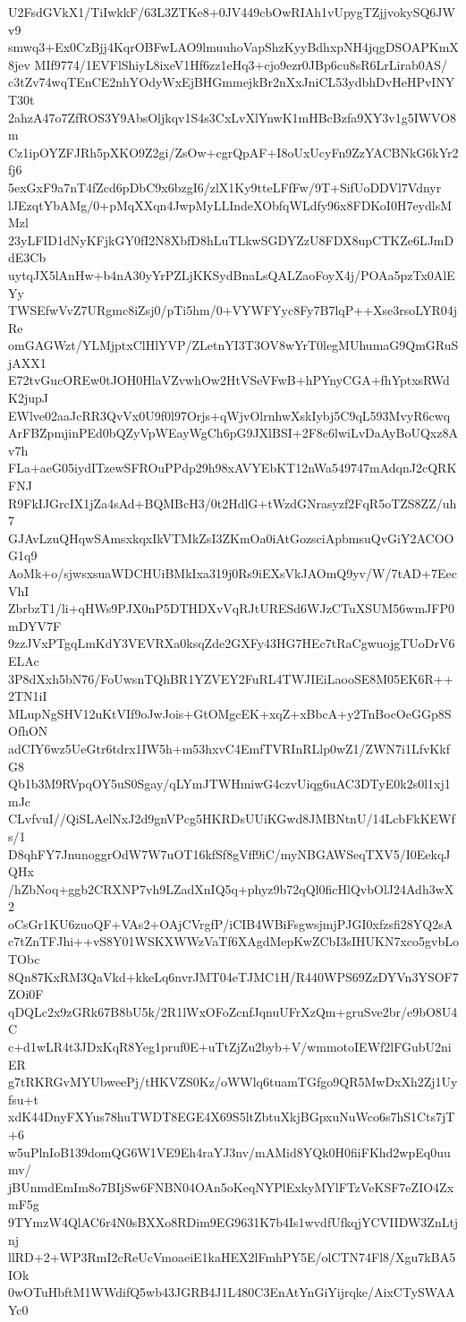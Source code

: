 U2FsdGVkX1/TiIwkkF/63L3ZTKe8+0JV449cbOwRIAh1vUpygTZjjvokySQ6JWv9
smwq3+Ex0CzBjj4KqrOBFwLAO9lmuuhoVapShzKyyBdhxpNH4jqgDSOAPKmX8jev
MIf9774/1EVFlShiyL8ixeV1Hf6zz1eHq3+cjo9ezr0JBp6cu8sR6LrLirab0AS/
c3tZv74wqTEnCE2nhYOdyWxEjBHGmmejkBr2nXxJniCL53ydbhDvHeHPvINYT30t
2ahzA47o7ZfROS3Y9AbsOljkqv1S4s3CxLvXlYnwK1mHBcBzfa9XY3v1g5IWVO8m
Cz1ipOYZFJRh5pXKO9Z2gi/ZsOw+cgrQpAF+I8oUxUcyFn9ZzYACBNkG6kYr2fj6
5exGxF9a7nT4fZcd6pDbC9x6bzgI6/zlX1Ky9tteLFfFw/9T+SifUoDDVl7Vdnyr
lJEzqtYbAMg/0+pMqXXqn4JwpMyLLIndeXObfqWLdfy96x8FDKoI0H7eydlsMMzl
23yLFID1dNyKFjkGY0fI2N8XbfD8hLuTLkwSGDYZzU8FDX8upCTKZe6LJmDdE3Cb
uytqJX5lAnHw+b4nA30yYrPZLjKKSydBnaLsQALZaoFoyX4j/POAa5pzTx0AlEYy
TWSEfwVvZ7URgmc8iZsj0/pTi5hm/0+VYWFYyc8Fy7B7lqP++Xse3rsoLYR04jRe
omGAGWzt/YLMjptxClHlYVP/ZLetnYI3T3OV8wYrT0legMUhumaG9QmGRuSjAXX1
E72tvGucOREw0tJOH0HlaVZvwhOw2HtVSeVFwB+hPYnyCGA+fhYptxsRWdK2jupJ
EWlve02aaJcRR3QvVx0U9f0l97Orjs+qWjvOlrnhwXskIybj5C9qL593MvyR6cwq
ArFBZpmjinPEd0bQZyVpWEayWgCh6pG9JXlBSI+2F8c6lwiLvDaAyBoUQxz8Av7h
FLa+aeG05iydITzewSFROuPPdp29h98xAVYEbKT12nWa549747mAdqnJ2cQRKFNJ
R9FkIJGrcIX1jZa4sAd+BQMBcH3/0t2HdlG+tWzdGNrasyzf2FqR5oTZS8ZZ/uh7
GJAvLzuQHqwSAmsxkqxIkVTMkZsI3ZKmOa0iAtGozsciApbmsuQvGiY2ACOOG1q9
AoMk+o/sjwsxsuaWDCHUiBMkIxa319j0Rs9iEXsVkJAOmQ9yv/W/7tAD+7EecVhI
ZbrbzT1/li+qHWs9PJX0nP5DTHDXvVqRJtURESd6WJzCTuXSUM56wmJFP0mDYV7F
9zzJVxPTgqLmKdY3VEVRXa0ksqZde2GXFy43HG7HEc7tRaCgwuojgTUoDrV6ELAc
3P8dXxh5bN76/FoUwsnTQhBR1YZVEY2FuRL4TWJIEiLaooSE8M05EK6R++2TN1iI
MLupNgSHV12uKtVIf9oJwJois+GtOMgcEK+xqZ+xBbcA+y2TnBocOeGGp8SOfhON
adCIY6wz5UeGtr6tdrx1IW5h+m53hxvC4EmfTVRInRLlp0wZ1/ZWN7i1LfvKkfG8
Qb1b3M9RVpqOY5uS0Sgay/qLYmJTWHmiwG4czvUiqg6uAC3DTyE0k2s0l1xj1mJc
CLvfvuI//QiSLAelNxJ2d9gnVPcg5HKRDsUUiKGwd8JMBNtnU/14LcbFkKEWfs/1
D8qhFY7JnunoggrOdW7W7uOT16kfSf8gVff9iC/myNBGAWSeqTXV5/I0EekqJQHx
/hZbNoq+ggb2CRXNP7vh9LZadXnIQ5q+phyz9b72qQl0ficHlQvbOlJ24Adh3wX2
oCsGr1KU6zuoQF+VAs2+OAjCVrgfP/iCIB4WBiFsgwsjmjPJGI0xfzsfi28YQ2sA
c7tZnTFJhi++vS8Y01WSKXWWzVaTf6XAgdMepKwZCbI3sIHUKN7xco5gvbLoTObc
8Qn87KxRM3QaVkd+kkeLq6nvrJMT04eTJMC1H/R440WPS69ZzDYVn3YSOF7ZOi0F
qDQLc2x9zGRk67B8bU5k/2R1lWxOFoZcnfJqnuUFrXzQm+gruSve2br/e9bO8U4C
c+d1wLR4t3JDxKqR8Yeg1pruf0E+uTtZjZu2byb+V/wmmotoIEWf2lFGubU2niER
g7tRKRGvMYUbweePj/tHKVZS0Kz/oWWlq6tuamTGfgo9QR5MwDxXh2Zj1Uyfsu+t
xdK44DnyFXYus78huTWDT8EGE4X69S5ltZbtuXkjBGpxuNuWco6s7hS1Cts7jT+6
w5uPlnIoB139domQG6W1VE9Eh4raYJ3nv/mAMid8YQk0H0fiiFKhd2wpEq0uumv/
jBUnmdEmIm8o7BIjSw6FNBN04OAn5oKeqNYPlExkyMYlFTzVeKSF7eZIO4ZxmF5g
9TYmzW4QlAC6r4N0sBXXo8RDim9EG9631K7b4Is1wvdfUfkqjYCVIIDW3ZnLtjnj
llRD+2+WP3RmI2cReUcVmoaeiE1kaHEX2lFmhPY5E/olCTN74Fl8/Xgu7kBA5IOk
0wOTuHbftM1WWdifQ5wb43JGRB4J1L480C3EnAtYnGiYijrqke/AixCTySWAAYc0
